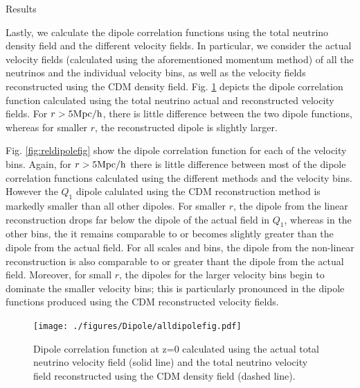 \begin{section}{Results}
\par Lastly, we calculate the dipole correlation functions using the total 
neutrino density field and the different velocity fields. In particular, 
we consider the actual velocity fields (calculated using the aforementioned 
momentum method) of all the neutrinos and the individual velocity bins, as 
well as the velocity fields reconstructed using the CDM density field. 
Fig. \ref{fig:dipolefig} depicts the dipole correlation 
function calculated using the total neutrino actual and reconstructed velocity fields. 
For $r>5\mbox{Mpc}/\mbox{h}$, there is little difference between the two dipole functions,
whereas for smaller $r$, the reconstructed dipole is slightly larger.

\par Fig. \ref{fig:reldipolefig} show the dipole correlation function for 
each of the velocity bins. Again, for $r>5\mbox{Mpc}/\mbox{h}$ there is little 
difference between most of the dipole correlation functions
calculated using the different methods and the velocity bins. However the
$Q_1$ dipole calulated using the CDM reconstruction method is markedly 
smaller than all other dipoles. For smaller $r$, the dipole from the linear 
reconstruction drops far below the dipole of the actual field in $Q_1$, 
whereas in the other bins, the it remains comparable to or becomes slightly 
greater than the dipole from the actual field. For all scales and 
bins, the dipole from the non-linear reconstruction is also comparable 
to or greater thant the dipole from the actual field. Moreover, for small $r$, 
the dipoles for the larger velocity bins begin to dominate the 
smaller velocity bins; this is particularly pronounced in the dipole 
functions produced using the CDM reconstructed velocity fields.

\begin{figure}[tbp]
  \begin{center}
    \texttt{[image: ./figures/Dipole/alldipolefig.pdf]}
    \caption{Dipole correlation function at z=0 calculated 
	      using the actual total neutrino velocity field (solid line) 
	      and the total neutrino velocity field reconstructed using the CDM 
	      density field (dashed line).}
    \label{fig:dipolefig}
  \end{center}
\end{figure}


\end{section}
